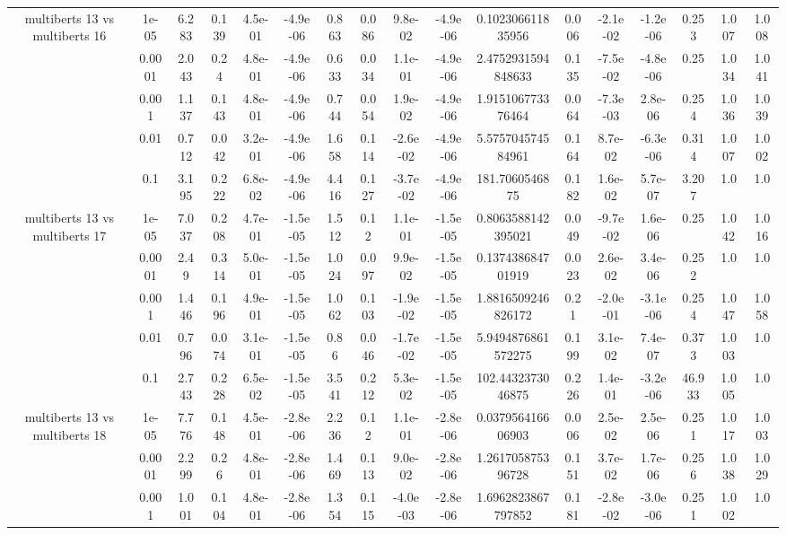 \begin{tabular}{|c|c|c|c|c|c|c|c|c|c|c|c|c|c|c|c|c|}
\hline
\multirow{5}{*}{multiberts 13 vs multiberts 16} & 1e-05 & 6.283 & 0.139 & 4.5e-01 & -4.9e-06 & 0.863 & 0.086 & 9.8e-02 & -4.9e-06 & 0.102306611835956 & 0.006 & -2.1e-02 & -1.2e-06 & 0.253 & 1.007 & 1.008 \\
 & 0.0001 & 2.043 & 0.24 & 4.8e-01 & -4.9e-06 & 0.633 & 0.034 & 1.1e-01 & -4.9e-06 & 2.4752931594848633 & 0.135 & -7.5e-02 & -4.8e-06 & 0.25 & 1.034 & 1.041 \\
 & 0.001 & 1.137 & 0.143 & 4.8e-01 & -4.9e-06 & 0.744 & 0.054 & 1.9e-02 & -4.9e-06 & 1.915106773376464 & 0.064 & -7.3e-03 & 2.8e-06 & 0.254 & 1.036 & 1.039 \\
 & 0.01 & 0.712 & 0.042 & 3.2e-01 & -4.9e-06 & 1.658 & 0.114 & -2.6e-02 & -4.9e-06 & 5.575704574584961 & 0.164 & 8.7e-02 & -6.3e-06 & 0.314 & 1.007 & 1.002 \\
 & 0.1 & 3.195 & 0.222 & 6.8e-02 & -4.9e-06 & 4.416 & 0.127 & -3.7e-02 & -4.9e-06 & 181.7060546875 & 0.182 & 1.6e-02 & 5.7e-07 & 3.207 & 1.0 & 1.0 \\
\hline
\multirow{5}{*}{multiberts 13 vs multiberts 17} & 1e-05 & 7.037 & 0.208 & 4.7e-01 & -1.5e-05 & 1.512 & 0.12 & 1.1e-01 & -1.5e-05 & 0.8063588142395021 & 0.049 & -9.7e-02 & 1.6e-06 & 0.25 & 1.042 & 1.016 \\
 & 0.0001 & 2.49 & 0.314 & 5.0e-01 & -1.5e-05 & 1.024 & 0.097 & 9.9e-02 & -1.5e-05 & 0.137438684701919 & 0.023 & 2.6e-02 & 3.4e-06 & 0.252 & 1.0 & 1.0 \\
 & 0.001 & 1.446 & 0.196 & 4.9e-01 & -1.5e-05 & 1.062 & 0.103 & -1.9e-02 & -1.5e-05 & 1.8816509246826172 & 0.21 & -2.0e-01 & -3.1e-06 & 0.254 & 1.047 & 1.058 \\
 & 0.01 & 0.796 & 0.074 & 3.1e-01 & -1.5e-05 & 0.86 & 0.046 & -1.7e-02 & -1.5e-05 & 5.9494876861572275 & 0.199 & 3.1e-02 & 7.4e-07 & 0.373 & 1.003 & 1.0 \\
 & 0.1 & 2.743 & 0.228 & 6.5e-02 & -1.5e-05 & 3.541 & 0.212 & 5.3e-02 & -1.5e-05 & 102.4432373046875 & 0.226 & 1.4e-01 & -3.2e-06 & 46.933 & 1.005 & 1.0 \\
\hline
\multirow{5}{*}{multiberts 13 vs multiberts 18} & 1e-05 & 7.776 & 0.148 & 4.5e-01 & -2.8e-06 & 2.236 & 0.12 & 1.1e-01 & -2.8e-06 & 0.037956416606903 & 0.006 & 2.5e-02 & 2.5e-06 & 0.251 & 1.017 & 1.003 \\
 & 0.0001 & 2.299 & 0.26 & 4.8e-01 & -2.8e-06 & 1.469 & 0.113 & 9.0e-02 & -2.8e-06 & 1.261705875396728 & 0.151 & 3.7e-02 & 1.7e-06 & 0.256 & 1.038 & 1.029 \\
 & 0.001 & 1.001 & 0.104 & 4.8e-01 & -2.8e-06 & 1.354 & 0.115 & -4.0e-03 & -2.8e-06 & 1.6962823867797852 & 0.181 & -2.8e-02 & -3.0e-06 & 0.251 & 1.002 & 1.0 \\

\end{tabular}
